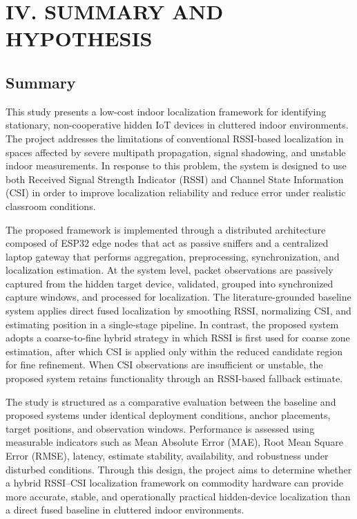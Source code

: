 \section*{IV. SUMMARY AND HYPOTHESIS}

\subsection*{Summary}

This study presents a low-cost indoor localization framework for identifying stationary, non-cooperative hidden IoT devices in cluttered indoor environments. The project addresses the limitations of conventional RSSI-based localization in spaces affected by severe multipath propagation, signal shadowing, and unstable indoor measurements. In response to this problem, the system is designed to use both Received Signal Strength Indicator (RSSI) and Channel State Information (CSI) in order to improve localization reliability and reduce error under realistic classroom conditions.

The proposed framework is implemented through a distributed architecture composed of ESP32 edge nodes that act as passive sniffers and a centralized laptop gateway that performs aggregation, preprocessing, synchronization, and localization estimation. At the system level, packet observations are passively captured from the hidden target device, validated, grouped into synchronized capture windows, and processed for localization. The literature-grounded baseline system applies direct fused localization by smoothing RSSI, normalizing CSI, and estimating position in a single-stage pipeline. In contrast, the proposed system adopts a coarse-to-fine hybrid strategy in which RSSI is first used for coarse zone estimation, after which CSI is applied only within the reduced candidate region for fine refinement. When CSI observations are insufficient or unstable, the proposed system retains functionality through an RSSI-based fallback estimate.

The study is structured as a comparative evaluation between the baseline and proposed systems under identical deployment conditions, anchor placements, target positions, and observation windows. Performance is assessed using measurable indicators such as Mean Absolute Error (MAE), Root Mean Square Error (RMSE), latency, estimate stability, availability, and robustness under disturbed conditions. Through this design, the project aims to determine whether a hybrid RSSI--CSI localization framework on commodity hardware can provide more accurate, stable, and operationally practical hidden-device localization than a direct fused baseline in cluttered indoor environments.


